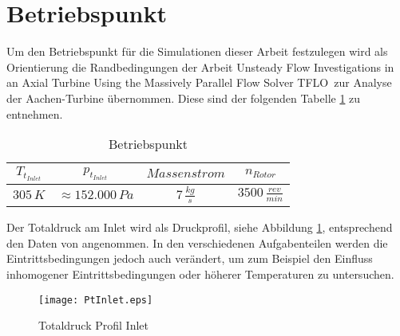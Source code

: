\section{Betriebspunkt}
\label{subsec:aachensetup}
Um den Betriebspunkt für die Simulationen dieser Arbeit festzulegen wird als Orientierung die Randbedingungen der Arbeit \glqq Unsteady Flow Investigations in an
Axial Turbine Using the Massively
Parallel Flow Solver TFLO\grqq \, \cite{ufi2001YaoDavis} zur Analyse der Aachen-Turbine übernommen. Diese sind der folgenden Tabelle \ref{tab:aachensetup} zu entnehmen.
\begin{table}[H]
\centering
\caption{Betriebspunkt} \label{tab:aachensetup}
\begin{tabular}{ c| c| c| c}
$T_{t_{Inlet}}$&$p_{t_{Inlet}}$&$Massenstrom$&$n_{Rotor}$\\
\hline
$305 \, K$&$\approx152.000 \, Pa$&$7 \, \frac{kg}{s}$&$3500 \, \frac{rev}{min}$\\
\end{tabular}
\end{table}
Der Totaldruck am Inlet wird als Druckprofil, siehe Abbildung \ref{fig:ptinlet}, entsprechend den Daten von \cite[p. 4]{ufi2001YaoDavis} angenommen.
In den verschiedenen Aufgabenteilen werden die Eintrittsbedingungen jedoch auch verändert, um zum Beispiel den Einfluss inhomogener Eintrittsbedingungen oder höherer Temperaturen zu untersuchen.

\begin{figure}[htbp]
	\centering
	\texttt{[image: PtInlet.eps]}
	\caption{Totaldruck Profil Inlet} \label{fig:ptinlet}
\end{figure}







